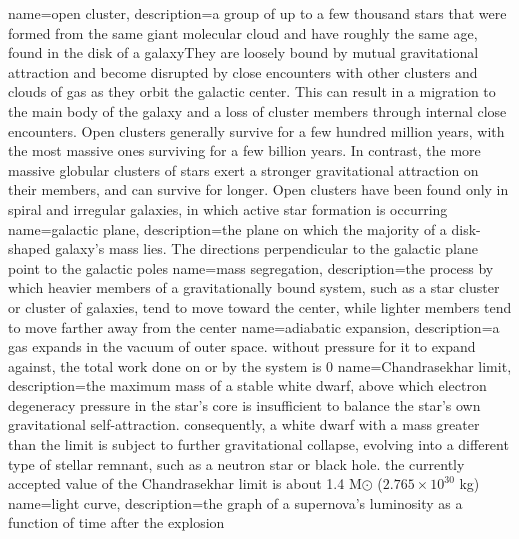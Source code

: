 {
	name={open cluster},
	description={a group of up to a few thousand stars that were formed from the same giant molecular cloud and have roughly the same age, found in the disk of a galaxyThey are loosely bound by mutual gravitational attraction and become disrupted by close encounters with other clusters and clouds of gas as they orbit the galactic center. This can result in a migration to the main body of the galaxy and a loss of cluster members through internal close encounters. Open clusters generally survive for a few hundred million years, with the most massive ones surviving for a few billion years. In contrast, the more massive globular clusters of stars exert a stronger gravitational attraction on their members, and can survive for longer. Open clusters have been found only in spiral and irregular galaxies, in which active star formation is occurring}
}
{
	name={galactic plane},
	description={the plane on which the majority of a disk-shaped galaxy's mass lies. The directions perpendicular to the galactic plane point to the galactic poles}
}
{
	name={mass segregation},
	description={the process by which heavier members of a gravitationally bound system, such as a star cluster or cluster of galaxies, tend to move toward the center, while lighter members tend to move farther away from the center}
}
{
	name={adiabatic expansion},
	description={a gas expands in the vacuum of outer space. without pressure for it to expand against, the total work done on or by the system is 0}
}
{
	name={Chandrasekhar limit},
	description={the maximum mass of a stable white dwarf, above which electron degeneracy pressure in the star's core is insufficient to balance the star's own gravitational self-attraction. consequently, a white dwarf with a mass greater than the limit is subject to further gravitational collapse, evolving into a different type of stellar remnant, such as a neutron star or black hole. the currently accepted value of the Chandrasekhar limit is about 1.4 M$\odot$ ($2.765\times10^{30}$ kg)}
}
{
	name={light curve},
	description={the graph of a supernova's luminosity as a function of time after the explosion}
}